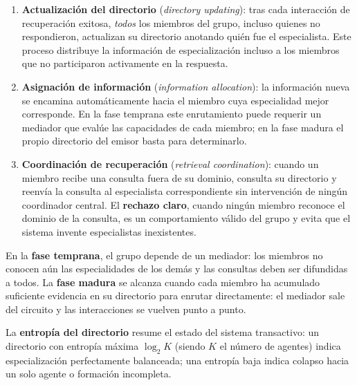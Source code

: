 \begin{enumerate}
    \item \textbf{Actualización del directorio} (\emph{directory updating}):
    tras cada interacción de recuperación exitosa, \emph{todos} los miembros del grupo,
    incluso quienes no respondieron, actualizan su directorio anotando quién
    fue el especialista.
    Este proceso distribuye la información de especialización incluso a los miembros que
    no participaron activamente en la respuesta.

    \item \textbf{Asignación de información} (\emph{information allocation}):
    la información nueva se encamina automáticamente hacia el miembro cuya especialidad
    mejor corresponde.
    En la fase temprana este enrutamiento puede requerir un mediador que evalúe las
    capacidades de cada miembro; en la fase madura el propio directorio del emisor
    basta para determinarlo.

    \item \textbf{Coordinación de recuperación} (\emph{retrieval coordination}):
    cuando un miembro recibe una consulta fuera de su dominio, consulta su directorio
    y reenvía la consulta al especialista correspondiente sin intervención de ningún
    coordinador central.
    El \textbf{rechazo claro}, cuando ningún miembro reconoce el dominio de la
    consulta, es un comportamiento válido del grupo y evita que el sistema invente
    especialistas inexistentes.
\end{enumerate}

En la \textbf{fase temprana}, el grupo depende de un mediador: los miembros
no conocen aún las especialidades de los demás y las consultas deben ser difundidas a
todos.
La \textbf{fase madura} se alcanza cuando cada miembro ha acumulado suficiente evidencia
en su directorio para enrutar directamente: el mediador sale del circuito y las
interacciones se vuelven punto a punto.

La \textbf{entropía del directorio} resume el estado del sistema transactivo:
un directorio con entropía máxima $\log_2 K$ (siendo $K$ el número de agentes)
indica especialización perfectamente balanceada; una entropía baja indica colapso hacia
un solo agente o formación incompleta.
